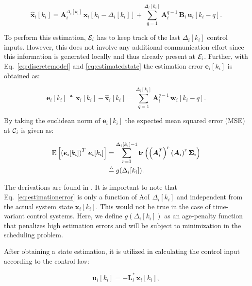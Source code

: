 \begin{equation}
  \label{eq:estimatedstate}
    \boldsymbol{\hat{x}}_i[k_i] = \boldsymbol{A}_i^{\Delta_i[k_i]} \,  \boldsymbol{x}_i[k_i - \Delta_i[k_i]] + \sum_{q=1}^{\Delta_i[k_i]} \boldsymbol{A}_i^{q - 1} \, \boldsymbol{B}_i \, \boldsymbol{u}_i [k_i - q].
\end{equation}

To perform this estimation, $\mathcal{E}_i$ has to keep track of the last
$\Delta_i[k_i]$ control inputs. However, this does not involve any additional
communication effort since this information is generated locally and thus
already present at $\mathcal{E}_i$. Further, with Eq.~\eqref{eq:discretemodel} and
\eqref{eq:estimatedstate} the estimation error $\boldsymbol{e}_i[k_i]$ is
obtained as:

\begin{equation}
  \boldsymbol{e}_i[k_i] \triangleq \boldsymbol{x}_i[k_i] - \boldsymbol{\hat{x}}_i[k_i] = \sum_{q=1}^{\Delta_i[k_i]} \boldsymbol{A}_i^{q-1} \, \boldsymbol{w}_i[k_i - q].
\end{equation}

By taking the euclidean norm of $\boldsymbol{e}_i[k_i]$ the expected mean
squared error (MSE) at $\mathcal{C}_i$ is given as:

\begin{align}
  \label{eq:estimationerror}
  \mathbb{E} \left[ \left(\boldsymbol{e}_i[k_i]\right)^T \, \boldsymbol{e}_i[k_i]\right] & = \sum_{r=1}^{\Delta_i[k_i] - 1} \mathsf{tr} \left( \left(\boldsymbol{A}_i^T\right)^r  \left(\boldsymbol{A}_i \right)^r \boldsymbol{\Sigma}_i \right) \\ \nonumber
  & \triangleq g(\Delta_i[k_i]).
\end{align}

The derivations are found in \cite{ayan2019age}. It is important to note that
Eq.~\eqref{eq:estimationerror} is only a function of AoI $\Delta_i[k_i]$ and
independent from the actual system state $\boldsymbol{x}_i[k_i]$. This would not
be true in the case of time-variant control systems. Here, we define
$g(\Delta_i[k_i])$ as an age-penalty function that penalizes high estimation
errors and will be subject to minimization in the scheduling problem. 

After obtaining a state estimation, it is utilized in calculating the control
input according to the control law:

\begin{equation}
  \label{eq:controllaw}
  \boldsymbol{u}_i[k_i] = - \boldsymbol{L}_i^* \,\boldsymbol{\hat{x}}_i[k_i],
\end{equation}

